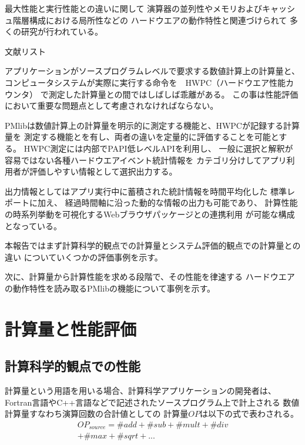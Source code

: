 \documentclass[submit,techrep,noauthor]{ipsj}
\begin{document}
最大性能と実行性能との違いに関して
演算器の並列性やメモリおよびキャッシュ階層構成における局所性などの
ハードウエアの動作特性と関連づけられて
多くの研究が行われている。
{ \color{blue}
文献リスト\par
}

アプリケーションがソースプログラムレベルで要求する数値計算上の計算量と、
コンピュータシステムが実際に実行する命令を　HWPC（ハードウエア性能カウンタ）
で測定した計算量との間ではしばしば乖離がある。
この事は性能評価において重要な問題点として考慮されなければならない。

PMlibは数値計算上の計算量を明示的に測定する機能と、HWPCが記録する計算量を
測定する機能とを有し、両者の違いを定量的に評価することを可能とする。
HWPC測定には内部でPAPI低レベルAPIを利用し、
一般に選択と解釈が容易ではない各種ハードウエアイベント統計情報を
カテゴリ分けしてアプリ利用者が評価しやすい情報として選択出力する。

出力情報としてはアプリ実行中に蓄積された統計情報を時間平均化した
標準レポートに加え、
経過時間軸に沿った動的な情報の出力も可能であり、
計算性能の時系列挙動を可視化するWebブラウザパッケージとの連携利用
が可能な構成となっている。

本報告ではまず計算科学的観点での計算量とシステム評価的観点での計算量との違い
についていくつかの評価事例を示す。

次に、計算量から計算性能を求める段階で、その性能を律速する
ハードウエアの動作特性を読み取るPMlibの機能について事例を示す。



\section {計算量と性能評価}
\label{section:computing-volume}

\subsection {計算科学的観点での性能}
\label{subsection:scientific-perf}
計算量という用語を用いる場合、計算科学アプリケーションの開発者は、
Fortran言語やC++言語などで記述されたソースプログラム上で計上される
数値計算量すなわち演算回数の合計値としての
計算量\begin{math} OP \end{math}は以下の式で表わされる。
\begin{align*}
OP_{source} = \#add + \#sub + \#mult + \#div \\
	+ \#max + \#sqrt + ...
\end{align*}
\end{document}
